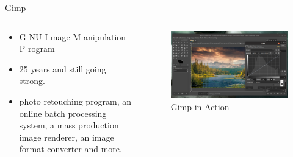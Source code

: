 \documentclass[presentation]{beamer}
\begin{document}
\begin{frame}[label={sec:org746eb15}]{Gimp}
\begin{columns}
\begin{column}{0.5\columnwidth}
\begin{itemize}
\item \alert{G} NU  \alert{I} mage  \alert{M} anipulation  \alert{P} rogram
\item 25 years and still going strong.
\item photo retouching program, an online batch processing system, a mass production image renderer, an image format converter and more.
\end{itemize}
\end{column}
\begin{column}{0.5\columnwidth}
\begin{figure}[htbp]
\centering
\includegraphics[width=.9\linewidth]{./images/gimp.png}
\caption{Gimp in Action}
\end{figure}
\end{column}
\end{columns}
\end{frame}
\end{document}
